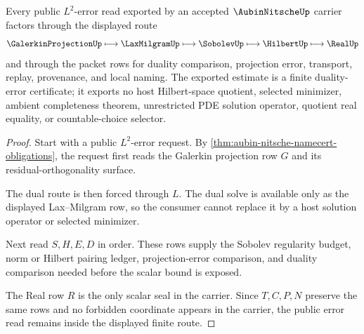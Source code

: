 \begin{theorem}
\label{thm:aubin-nitsche-duality-error-route}
Every public $L^2$-error read exported by an accepted $\AubinNitscheUp$ carrier factors through the displayed route
$$
\GalerkinProjectionUp \longmapsto \LaxMilgramUp \longmapsto \SobolevUp \longmapsto \HilbertUp \longmapsto \RealUp
$$
and through the packet rows for duality comparison, projection error, transport, replay, provenance, and local naming. The exported estimate is a finite duality-error certificate; it exports no host Hilbert-space quotient, selected minimizer, ambient completeness theorem, unrestricted PDE solution operator, quotient real equality, or countable-choice selector.
\end{theorem}
\begin{proof}
Start with a public $L^2$-error request. By \autoref{thm:aubin-nitsche-namecert-obligations}, the request first reads the Galerkin projection row $G$ and its residual-orthogonality surface.

The dual route is then forced through $L$. The dual solve is available only as the displayed Lax--Milgram row, so the consumer cannot replace it by a host solution operator or selected minimizer.

Next read $S,H,E,D$ in order. These rows supply the Sobolev regularity budget, norm or Hilbert pairing ledger, projection-error comparison, and duality comparison needed before the scalar bound is exposed.

The Real row $R$ is the only scalar seal in the carrier. Since $T,C,P,N$ preserve the same rows and no forbidden coordinate appears in the carrier, the public error read remains inside the displayed finite route.
\end{proof}




